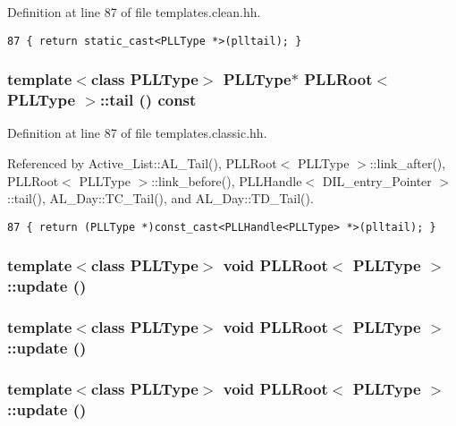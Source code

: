 Definition at line 87 of file templates.clean.hh.



\footnotesize\begin{verbatim}87 { return static_cast<PLLType *>(plltail); } 
\end{verbatim}\normalsize 
{}
\subsubsection{\setlength{\rightskip}{0pt plus 5cm}template$<$class PLLType$>$ {\bf PLLType}$\ast$ PLLRoot$<$ {\bf PLLType} $>$::tail () const\hspace{0.3cm}{\tt  [inline]}}\label{classPLLRoot_a3}




Definition at line 87 of file templates.classic.hh.

Referenced by Active\_\-List::AL\_\-Tail(), PLLRoot$<$ PLLType $>$::link\_\-after(), PLLRoot$<$ PLLType $>$::link\_\-before(), PLLHandle$<$ DIL\_\-entry\_\-Pointer $>$::tail(), AL\_\-Day::TC\_\-Tail(), and AL\_\-Day::TD\_\-Tail().



\footnotesize\begin{verbatim}87 { return (PLLType *)const_cast<PLLHandle<PLLType> *>(plltail); } 
\end{verbatim}\normalsize 
{}
\subsubsection{\setlength{\rightskip}{0pt plus 5cm}template$<$class PLLType$>$ void PLLRoot$<$ {\bf PLLType} $>$::update ()\hspace{0.3cm}{\tt  [inline]}}\label{classPLLRoot_a58}


\subsubsection{\setlength{\rightskip}{0pt plus 5cm}template$<$class PLLType$>$ void PLLRoot$<$ {\bf PLLType} $>$::update ()\hspace{0.3cm}{\tt  [inline]}}\label{classPLLRoot_a41}


\subsubsection{\setlength{\rightskip}{0pt plus 5cm}template$<$class PLLType$>$ void PLLRoot$<$ {\bf PLLType} $>$::update ()\hspace{0.3cm}{\tt  [inline]}}\label{classPLLRoot_a24}


